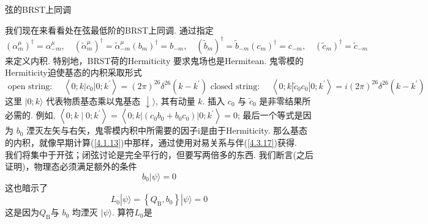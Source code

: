 \centerline{\Large 弦的BRST上同调}
我们现在来看看处在弦最低阶的BRST上同调. 通过指定
\begin{subequations}\label{4.3.17}
\begin{equation}
\left(\alpha_{m}^{\mu}\right)^{\dagger}=\alpha_{-m}^{\mu}, \quad\left(\tilde{\alpha}_{m}^{\mu}\right)^{\dagger}=\tilde{\alpha}_{-m}^{\mu}
\end{equation}
\begin{equation}
\left(b_{m}\right)^{\dagger}=b_{-m}, \quad\left(\tilde{b}_{m}\right)^{\dagger}=\tilde{b}_{-m}
\end{equation}
\begin{equation}
\left(c_{m}\right)^{\dagger}=c_{-m}, \quad\left(\tilde{c}_{m}\right)^{\dagger}=\tilde{c}_{-m}
\end{equation}
\end{subequations}
来定义内积. 特别地，BRST荷的Hermiticity 要求鬼场也是Hermitean. 
鬼零模的Hermiticity迫使基态的内积采取形式
\begin{subequations}
\begin{equation}
\text { open string: } \quad\left\langle 0 ; k\left|c_{0}\right| 0 ; k^{\prime}\right\rangle=(2 \pi)^{26} \delta^{26}\left(k-k^{\prime}\right)
\end{equation}
\begin{equation}
\text { closed string: } \quad\left\langle 0 ; k\left|\tilde{c}_{0} c_{0}\right| 0 ; k^{\prime}\right\rangle=i(2 \pi)^{26} \delta^{26}\left(k-k^{\prime}\right)
\end{equation}
\end{subequations}
这里 $|0 ; k\rangle$ 代表物质基态乘以鬼基态 $\downarrow\rangle$, 其有动量 $k$. 插入 $c_{0}$ 与 $\tilde{c}_{0}$ 是非零结果所必需的. 例如, $\left\langle 0 ; k \mid 0 ; k^{\prime}\right\rangle=\left\langle 0 ; k\left|\left(c_{0} b_{0}+b_{0} c_{0}\right)\right| 0 ; k^{\prime}\right\rangle=0$;
最后一个等式是因为 $b_{0}$ 湮灭左矢与右矢，鬼零模内积中所需要的因子i是由于Hermiticity. 那么基态的内积，就像早期计算(\ref{4.1.13})中那样，通过使用对易关系与伴(\ref{4.3.17})获得.\\
我们将集中于开弦；闭弦讨论是完全平行的，但要写两倍多的东西. 我们断言(之后证明)，物理态必须满足额外的条件 
\begin{equation}
b_{0}|\psi\rangle=0
\end{equation}
这也暗示了
\begin{equation}
L_{0}|\psi\rangle=\left\{Q_{\mathrm{B}}, b_{0}\right\}|\psi\rangle=0
\end{equation}
这是因为$Q_{\mathrm{B}}$与 $b_{0}$ 均湮灭 $|\psi\rangle$. 算符$L_{0}$是
